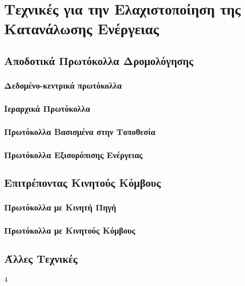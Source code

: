 
\chapter{Τεχνικές για την Ελαχιστοποίηση της Κατανάλωσης Ενέργειας}
\section{Αποδοτικά Πρωτόκολλα Δρομολόγησης}
\subsection{Δεδομένο-κεντρικά πρωτόκολλα}
\subsection{Ιεραρχικά Πρωτόκολλα}
\subsection{Πρωτόκολλα Βασισμένα στην Τοποθεσία}
\subsection{Πρωτόκολλα Εξισορόπισης Ενέργειας}
\section{Επιτρέποντας Κινητούς Κόμβους}
\subsection{Πρωτόκολλα με Κινητή Πηγή}
\subsection{Πρωτόκολλα με Κινητούς Κόμβους} %
\section{Άλλες Τεχνικές}


4